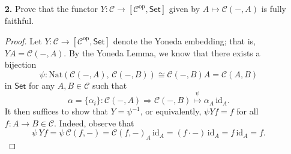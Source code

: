 \documentclass[ 12pt ]{article}
\begin{document}
\begin{enumerate}
\begin{proof}
			\begin{center}
			\end{center}
			Furthermore, consider the morphism $\varphi : A \to \mathscr{C}(X, \lim D)$ defined as the map $a \mapsto \varphi_a$. Observe that $\rho_i = \mathscr{C}(X, \pi_i) \varphi$ as a result of $$\rho_i a = \pi_i \varphi_a = (\pi_i \varphi) a = (\mathscr{C}(X, \pi_i) \varphi) a$$ for all $a \in A$. Additionally, it is clear that $\varphi$ is uniquely determined by $\{\rho_i\}_{i \in \mathscr{I}}$. Thus, $(\mathscr{C}(X, \lim D), \newline
			\mathscr{C}(X, \pi_i))$ is a limit of $\mathscr{C}(X, D-)$ and so $\mathscr{C}(X, \lim D) \cong \lim \mathscr{C}(X, D-)$ by the uniqueness of the limit.
		\end{proof}


	\item[\textbf{2.}] Prove that the functor $Y : \mathscr{C} \to [\mathscr{C}^\mathrm{op}, \mathsf{Set}]$ given by $A \mapsto \mathscr{C}(-, A)$ is fully faithful.

		\begin{proof}
			Let $Y : \mathscr{C} \to [\mathscr{C}^\mathrm{op}, \mathsf{Set}]$ denote the Yoneda embedding; that is, $YA = \mathscr{C}(-, A)$. By the Yoneda Lemma, we know that there exists a bijection $$\psi : \mathrm{Nat}(\mathscr{C}(-, A),\, \mathscr{C}(-, B)) \cong \mathscr{C}(-, B) A = \mathscr{C}(A, B)$$ in $\mathsf{Set}$ for any $A, B \in \mathscr{C}$ such that $$\alpha = \{\alpha_i\} : \mathscr{C}(-, A) \Rightarrow \mathscr{C}(-, B) \overset{\psi}{\longmapsto} \alpha_A\, \mathrm{id}_A.$$ It then suffices to show that $Y = \psi^{-1}$, or equivalently, $\psi Y f = f$ for all $f : A \to B \in \mathscr{C}$. Indeed, observe that $$\psi\, Y f = \psi\, \mathscr{C}(f, -) = \mathscr{C}(f, -)_A\, \mathrm{id}_A = (f \cdot -)\, \mathrm{id}_A = f\, \mathrm{id}_A = f.$$
		\end{proof}



\end{enumerate}
\end{document}
